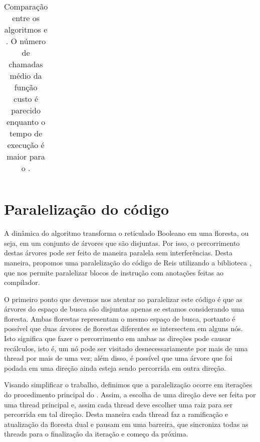 \begin{table}
\begin{tabular}{cc c cc c cc}
\bottomrule 
\end{tabular}%
\caption{Comparação entre os algoritmos  e . 
O número de chamadas médio da função custo é parecido enquanto o tempo
de execução é maior para o .}
\label{tab:opfs_vs_pfs}
\end{table}

\section{Paralelização do código}
A dinâmica do algoritmo  transforma o
reticulado Booleano em uma floresta, ou seja, em um conjunto de árvores
que são disjuntas. Por isso, o percorrimento destas árvores pode ser
feito de maneira paralela sem interferências. Desta maneira, propomos
uma paralelização do código de Reis utilizando a biblioteca 
, que nos permite paralelizar blocos de instrução
com anotações feitas ao compilador.

O primeiro ponto que devemos nos atentar ao paralelizar este código é
que as árvores do espaço de busca são disjuntas apenas se estamos 
considerando uma floresta. Ambas florestas representam o mesmo espaço de
busca, portanto é possível que duas árvores de florestas diferentes se 
intersectem em alguns nós. Isto significa que fazer o percorrimento em
ambas as direções pode causar recálculos, isto é, um nó pode ser 
visitado desnecessariamente por mais de uma thread por mais de uma vez;
além disso, é possível que uma árvore que foi podada em uma direção 
ainda esteja sendo percorrida em outra direção.

Visando simplificar o trabalho, definimos que a paralelização ocorre em
iterações do procedimento principal do . Assim, a escolha
de uma direção deve ser feita por uma thread principal e, assim cada
thread deve escolher uma raiz para ser percorrida em tal direção. Desta
maneira cada thread faz a ramificação e atualização da floresta dual
e pausam em uma barreira, que sincroniza todas as threads para o 
finalização da iteração e começo da próxima.

